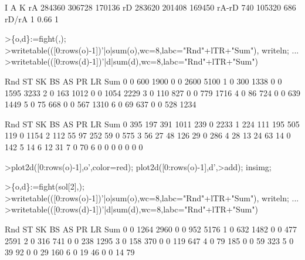 \documentclass[a4paper,10pt]{article}
\begin{document}
\begin{eulernotebook}
\begin{euleroutput}
                     I         A         K
          rA    284360    306728    170136
          rD    283620    201408    169450
       rA-rD       740    105320       686
       rD/rA         1      0.66         1
\end{euleroutput}
\begin{eulerprompt}
>\{o,d\}:=fight(,);
>writetable(([0:rows(o)-1])'|o|sum(o),wc=8,labc="Rnd"+lTR+"Sum"), writeln; ...
>writetable(([0:rows(d)-1])'|d|sum(d),wc=8,labc="Rnd"+lTR+"Sum")
\end{eulerprompt}
\begin{euleroutput}
       Rnd      ST      SK      BS      AS      PR      LR     Sum
         0       0     600    1900       0       0    2600    5100
         1       0     300    1338       0       0    1595    3233
         2       0     163    1012       0       0    1054    2229
         3       0     110     827       0       0     779    1716
         4       0      86     724       0       0     639    1449
         5       0      75     668       0       0     567    1310
         6       0      69     637       0       0     528    1234
  
       Rnd      ST      SK      BS      AS      PR      LR     Sum
         0     395     197     391    1011     239       0    2233
         1     224     111     195     505     119       0    1154
         2     112      55      97     252      59       0     575
         3      56      27      48     126      29       0     286
         4      28      13      24      63      14       0     142
         5      14       6      12      31       7       0      70
         6       0       0       0       0       0       0       0
\end{euleroutput}
\begin{eulerprompt}
>plot2d([0:rows(o)-1],o',color=red); plot2d([0:rows(o)-1],d',>add); insimg;
\end{eulerprompt}
\begin{eulerprompt}
>\{o,d\}:=fight(sol[2],);
>writetable(([0:rows(o)-1])'|o|sum(o),wc=8,labc="Rnd"+lTR+"Sum"), writeln; ...
>writetable(([0:rows(d)-1])'|d|sum(d),wc=8,labc="Rnd"+lTR+"Sum")
\end{eulerprompt}
\begin{euleroutput}
       Rnd      ST      SK      BS      AS      PR      LR     Sum
         0       0    1264    2960       0       0     952    5176
         1       0     632    1482       0       0     477    2591
         2       0     316     741       0       0     238    1295
         3       0     158     370       0       0     119     647
         4       0      79     185       0       0      59     323
         5       0      39      92       0       0      29     160
         6       0      19      46       0       0      14      79
  

\end{euleroutput}
\end{eulernotebook}
\end{document}
